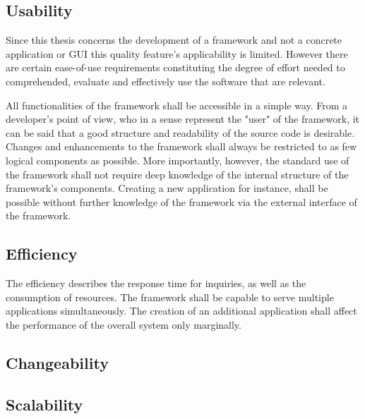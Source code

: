 \subsection{Usability}
Since this thesis concerns the development of a framework and not a concrete application or GUI this quality feature's applicability is limited. However there are certain ease-of-use requirements constituting the degree of effort needed to comprehended, evaluate and effectively use the software that are relevant.  


All functionalities of the framework shall be accessible in a simple way. From a developer's point of view, who in a sense represent the "user" of the framework, it can be said that a good structure and readability of the source code is desirable. Changes and enhancements to the framework shall always be restricted to as few logical components as possible. More importantly, however, the standard use of the framework shall not require deep knowledge of the internal structure of the framework's components. Creating a new application for instance, shall be possible without further knowledge of the framework via the external interface of the framework.


\subsection{Efficiency}
The efficiency describes the response time for inquiries, as well as the consumption of resources. The framework shall be capable to serve multiple applications simultaneously. The creation of an additional application shall affect the performance of the overall system only marginally.

\subsection{Changeability}
\subsection{Scalability}